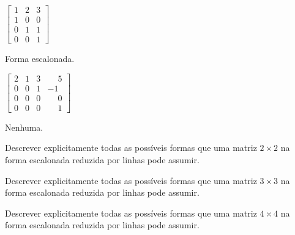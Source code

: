\documentclass[12pt]{exam}
\begin{document}
\begin{multicols}{2}
    \begin{exercicio}
        $\begin{bmatrix}1 & 2 & 3\\1 & 0 & 0\\0 & 1 & 1\\0 & 0 & 1\end{bmatrix}$
        \begin{solucao}
            Forma escalonada.
        \end{solucao}
    \end{exercicio}

    \begin{exercicio}\label{fimverificamatrizes}
        $\begin{bmatrix}2 & 1 & 3 & \phantom{-} 5\\0 & 0 & 1 & -1\\0 & 0 & 0 & \phantom{-} 0\\0 & 0 & 0 & \phantom{-} 1\end{bmatrix}$
        \begin{solucao}
            Nenhuma.
        \end{solucao}
    \end{exercicio}
\end{multicols}


\begin{exercicio}
  Descrever explicitamente todas as possíveis formas que uma matriz $2 \times 2$ na forma escalonada reduzida por linhas pode assumir.
\end{exercicio}

\begin{exercicio}
  Descrever explicitamente todas as possíveis formas que uma matriz $3 \times 3$ na forma escalonada reduzida por linhas pode assumir.
\end{exercicio}

\begin{exercicio}
  Descrever explicitamente todas as possíveis formas que uma matriz $4 \times 4$ na forma escalonada reduzida por linhas pode assumir.
\end{exercicio}
\end{document}
